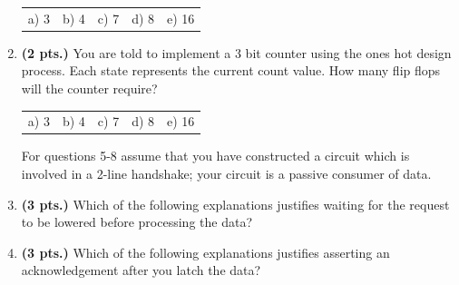 \documentclass{article}
\begin{document}
\begin{enumerate}
\begin{tabular}{p{0.75in}p{0.75in}p{0.75in}p{0.75in}p{0.75in}}
a) 3 & b) 4 & c) 7 & d) 8 & e) 16 \\
\end{tabular}

\item {\bf (2 pts.)} You are told to implement a 3 bit counter using the
ones hot design process.  Each state represents the current count value. 
How many flip flops will the counter require?

\begin{tabular}{p{0.75in}p{0.75in}p{0.75in}p{0.75in}p{0.75in}}
a) 3 & b) 4 & c) 7 & d) 8 & e) 16 \\
\end{tabular}

\pagebreak
For questions 5-8 assume that you have constructed a circuit
which is involved in a 2-line handshake; your circuit
is a passive consumer of data.  

\item {\bf (3 pts.)} Which of the following explanations justifies 
waiting for the request to be lowered before processing the data?

\item {\bf (3 pts.)} Which of the following explanations justifies asserting
an acknowledgement after you latch the data?


\end{enumerate}
\end{document}

